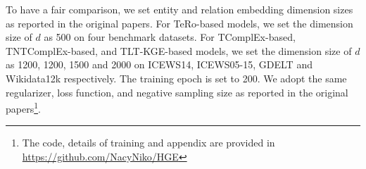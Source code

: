 \documentclass[letterpaper]{article} %
\begin{document}
To have a fair comparison, we set entity and relation embedding dimension sizes as reported in the original papers. For TeRo-based models, we set the dimension size of $d$ as 500 on four benchmark datasets. For TComplEx-based, TNTComplEx-based, and TLT-KGE-based models, we set the dimension size of $d$ as 1200, 1200, 1500 and 2000 on ICEWS14, ICEWS05-15, GDELT and Wikidata12k respectively. The training epoch is set to 200. We adopt the same regularizer, loss function, and negative sampling size as reported in the original papers\footnote{The code, details of training and appendix are provided in \url{https://github.com/NacyNiko/HGE}}. 
\end{document}
